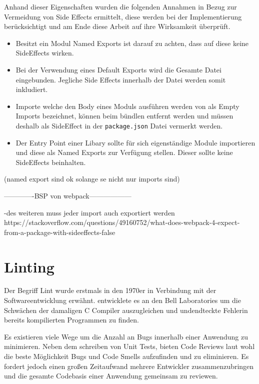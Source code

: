 Anhand dieser Eigenschaften wurden die folgenden Annahmen in Bezug zur Vermeidung von Side Effects ermittelt, diese werden bei der Implementierung berücksichtigt und am Ende diese Arbeit auf ihre Wirksamkeit überprüft.

\begin{itemize}
\item Besitzt ein Modul Named Exports ist darauf zu achten, dass auf diese keine SideEffects wirken.
\item Bei der Verwendung eines Default Exports wird die Gesamte Datei eingebunden. Jegliche Side Effects innerhalb der Datei werden somit inkludiert.
\item Importe welche den Body eines Moduls ausführen werden von \textcite{Rauschmayer2018} als Empty Imports bezeichnet, können beim bündlen entfernt werden und müssen deshalb als SideEffect in der \lstinline{package.json} Datei vermerkt werden.
\item Der Entry Point einer Libary sollte für sich eigenständige Module importieren und diese als Named Exports zur Verfügung stellen. Dieser sollte keine SideEffects beinhalten.
\end{itemize}

(named export sind ok solange se nicht nur imports sind)

-------------BSP von webpack------------------

-des weiteren muss jeder import auch exportiert werden
https://stackoverflow.com/questions/49160752/what-does-webpack-4-expect-from-a-package-with-sideeffects-false

\autocite{TamasSallai}

\section{Linting}
Der Begriff Lint wurde erstmals in den 1970er in Verbindung mit der Softwareentwicklung erwähnt. \textcite{Johnson1978} entwicklete es an den Bell Laboratories um die Schwächen der damaligen C Compiler auszugleichen und undendteckte Fehlerin bereits kompilierten Programmen zu finden.

Es existieren viele Wege um die Anzahl an Bugs innerhalb einer Anwendung zu minimieren. Neben dem schreiben von Unit Tests, bieten Code Reviews laut \textcite{Louridas2006} wohl die beste Möglichkeit Bugs und Code Smells aufzufinden und zu eliminieren. Es fordert jedoch einen großen Zeitaufwand mehrere Entwickler zusammenzubringen und die gesamte Codebasis einer Anwendung gemeinsam zu reviewen.

